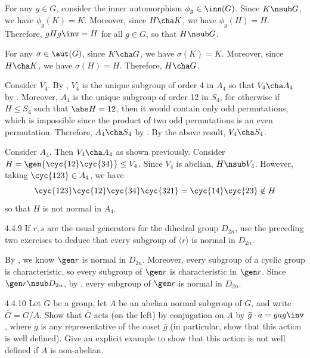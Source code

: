 \begin{solenum}
	\item For any $g \in G$, consider the inner automorphism $\phi_g \in \inn(G)$.
	Since $K \nsub G$, we have $\phi_g(K) = K$.
	Moreover, since $H \cha K$, we have $\phi_g(H) = H$.
	Therefore, $gHg\inv = H$ for all $g \in G$, so that $H \nsub G$.
	\item For any $\sigma \in \aut(G)$, since $K \cha G$, we have $\sigma(K) = K$.
	Moreover, since $H \cha K$, we have $\sigma(H) = H$.
	Therefore, $H \cha G$. 
	
	Consider $V_4$.
	By , $V_4$ is the unique subgroup of order 4 in $A_4$ so that $V_4 \cha A_4$ by .
	Moreover, $A_4$ is the unique subgroup of order 12 in $S_4$, for otherwise if $H \leq S_4$ such that $\abs H = 12$, then it would contain only odd permutations, which is impossible since the product of two odd permutations is an even permutation.
	Therefore, $A_4 \cha S_4$ by .
	By the above result, $V_4 \cha S_4$.
	\item Consider $A_4$.
	Then $V_4 \cha A_4$ as shown previously.
	Consider $H = \gen{\cyc{1 2}\cyc{3 4}} \leq V_4$.
	Since $V_4$ is abelian, $H \nsub V_4$.
	However, taking $\cyc{1 2 3} \in A_4$, we have
	\[
		\cyc{1 2 3}\cyc{1 2}\cyc{3 4}\cyc{3 2 1} = \cyc{1 4}\cyc{2 3} \notin H
	\]
	so that $H$ is not normal in $A_4$.
\end{solenum}

\begin{exercise}{4.4.9}
	If $r,s$ are the usual generators for the dihedral group $D_{2n}$, use the preceding two exercises to deduce that every subgroup of $\langle r\rangle$ is normal in $D_{2n}$.
\end{exercise}

\begin{sol}
	By , we know $\gen r$ is normal in $D_{2n}$.
	Moreover, every subgroup of a cyclic group is characteristic, so every subgroup of $\gen r$ is characteristic in $\gen r$.
	Since $\gen r \nsub D_{2n}$, by , every subgroup of $\gen r$ is normal in $D_{2n}$.
\end{sol}

\begin{exercise}{4.4.10}
	Let $G$ be a group, let $A$ be an abelian normal subgroup of $G$, and write $\overline{G}=G/A$.
	Show that $\overline{G}$ acts (on the left) by conjugation on $A$ by $\bar g \cdot a = gag\inv$, where $g$ is any representative of the coset $\bar g$ (in particular, show that this action is well defined).
	Give an explicit example to show that this action is not well defined if $A$ is non-abelian.
\end{exercise}

